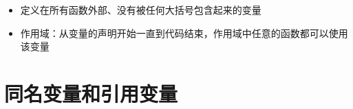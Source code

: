 \begin{frame}[fragile]
{{\begin{columns}[onlytextwidth,T]
\begin{itemize}
                \end{itemize}
            \end{columns}
        } {
            \begin{itemize}
                \item 定义在所有函数外部、没有被任何大括号包含起来的变量
                \item 作用域：从变量的声明开始一直到代码结束，作用域中任意的函数都可以使用该变量
            \end{itemize}
        }
    }
        
\end{frame}

\section{同名变量和引用变量}

